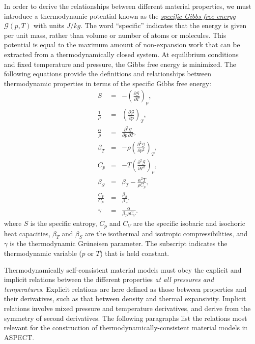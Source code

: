 \documentclass{article}
\newcommand{\aspect}{\textsc{ASPECT}}
\begin{document}
In order to derive the relationships between different material properties, we must
introduce a thermodynamic potential known as the
\href{https://en.wikipedia.org/wiki/Gibbs_free_energy}{\textit{specific
    Gibbs free energy}}
$\mathcal{G}(p, T)$ with units $\si{J}/\si{kg}$. The word ``specific'' indicates that the energy is
given per unit mass, rather than volume or number of atoms or molecules. This potential is
equal to the maximum amount of non-expansion work that can be extracted from a
thermodynamically closed system. At equilibrium conditions and fixed temperature and
pressure, the Gibbs free energy is minimized. The following equations provide the
definitions and relationships between thermodynamic properties in terms of the specific
Gibbs free energy:
\begin{eqnarray}
  S &=& - \left( \frac{\partial \mathcal{G}}{\partial T} \right)_{p}, \\
  \frac{1}{\rho} &=& \left( \frac{\partial \mathcal{G}}{\partial p} \right)_{T}, \label{eq:mm_density} \\
  \frac{\alpha}{\rho} &=& \frac{\partial^2 \mathcal{G}}{\partial {p} \, \partial {T}}, \label{eq:mm_alpha_g} \\
  \beta_T &=& -\rho \left( \frac{\partial^2 \mathcal{G}}{\partial {p}^2}  \right)_{T}, \label{eq:mm_betaT_g} \\
  C_p &=& -T \left( \frac{\partial^2 \mathcal{G}}{\partial {T}^2}  \right)_{p}, \label{eq:mm_isobaric_heat_capacity} \\
  \beta_S &=& \beta_T - \frac{\alpha^2 T}{\rho C_p}, \label{eq:mm_isentropic_compressibility} \\
  \frac{C_V}{C_p} &=& \frac{\beta_S}{\beta_T}, \\
  \gamma &=& \frac{\alpha }{\beta_T \rho C_V}. 
\end{eqnarray}
where $S$ is the specific entropy, $C_p$ and $C_V$ are the specific isobaric
and isochoric heat capacities, $\beta_T$ and $\beta_S$ are the isothermal and isotropic
compressibilities, and $\gamma$ is the thermodynamic Gr\"{u}neisen parameter. The subscript
indicates the thermodynamic variable ($p$ or $T$) that is held constant.

Thermodynamically self-consistent material models must obey the explicit and implicit relations
between the different properties \emph{at all pressures and temperatures}. Explicit relations
are here defined as those between properties and their derivatives, such as that between
density and thermal expansivity. Implicit relations involve mixed pressure and temperature
derivatives, and derive from the symmetry of second derivatives. The following paragraphs
list the relations most relevant for the construction of thermodynamically-consistent material
models in \aspect{}.
\end{document}
